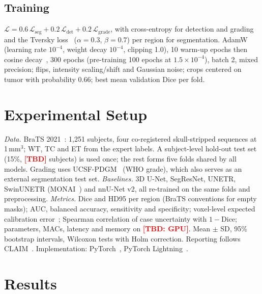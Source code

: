 \documentclass[journal]{IEEEtran}
\newcommand{\tbd}[1][]{\textcolor{red}{\textbf{[TBD#1]}}}
\begin{document}
\subsection{Training}
$\mathcal{L}=0.6\,\mathcal{L}_{\mathrm{seg}}+0.2\,\mathcal{L}_{\mathrm{det}}+0.2\,\mathcal{L}_{\mathrm{grade}}$, with cross-entropy for detection and grading and the Tversky loss~\cite{salehi2017tversky} ($\alpha=0.3$, $\beta=0.7$) per region for segmentation. AdamW~\cite{loshchilov2019adamw} (learning rate $10^{-4}$, weight decay $10^{-4}$, clipping 1.0), 10 warm-up epochs then cosine decay~\cite{loshchilov2017sgdr}, 300 epochs (pre-training 100 epochs at $1.5\times10^{-4}$), batch 2, mixed precision; flips, intensity scaling/shift and Gaussian noise; crops centered on tumor with probability 0.66; best mean validation Dice per fold.

\section{Experimental Setup}
\textit{Data.} BraTS 2021~\cite{baid2021brats}: 1,251 subjects, four co-registered skull-stripped sequences at 1\,mm$^3$; WT, TC and ET from the expert labels. A subject-level hold-out test set (15\%, \tbd{} subjects) is used once; the rest forms five folds shared by all models. Grading uses UCSF-PDGM~\cite{calabrese2022ucsfpdgm} (WHO grade), which also serves as an external segmentation test set.
\textit{Baselines.} 3D U-Net, SegResNet, UNETR, SwinUNETR (MONAI~\cite{cardoso2022monai}) and nnU-Net v2, all re-trained on the same folds and preprocessing.
\textit{Metrics.} Dice and HD95 per region (BraTS conventions for empty masks); AUC, balanced accuracy, sensitivity and specificity; voxel-level expected calibration error~\cite{guo2017calibration}; Spearman correlation of case uncertainty with $1-$Dice; parameters, MACs, latency and memory on \tbd[: GPU]. Mean $\pm$ SD, 95\% bootstrap intervals, Wilcoxon tests with Holm correction. Reporting follows CLAIM~\cite{mongan2020claim}. Implementation: PyTorch~\cite{paszke2019pytorch}, PyTorch Lightning~\cite{falcon2019lightning}.

\section{Results}
\end{document}
